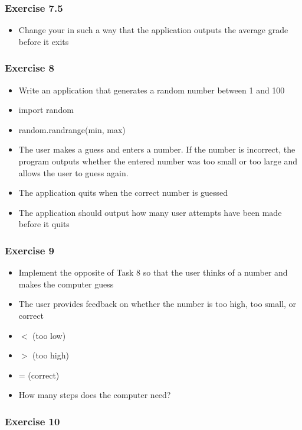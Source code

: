 \documentclass[10pt, a4paper]{beamer} %
\begin{document}
{\begin{frame}\frametitle{Exercise 7.5}

	\begin{itemize}
		\item Change your in such a way that the application outputs the average grade before it exits
	\end{itemize}


\end{frame}

\begin{frame}[c, fragile]\frametitle{Exercise 8}

	\begin{itemize}
		\item  Write an application that generates a random number between 1
		      and 100
		\item  import random
		\item  random.randrange(min, max)
		\item  The user makes a guess and enters a number. If the number is incorrect, the program outputs whether the entered number was too small or too large and allows the user to guess again.
		\item  The application quits when the correct number is guessed
		\item  The application should output how many user attempts have been
		      made before it quits
	\end{itemize}

\end{frame}

\begin{frame}[c, fragile]\frametitle{Exercise 9}

	\begin{itemize}
		\item Implement the opposite of Task 8 so that the user thinks of a number and makes the computer guess
		\item The user provides feedback on whether the number is too high, too small, or correct
		\item $<$ (too low)
		\item $>$ (too high)
		\item = (correct)
		\item How many steps does the computer need?
	\end{itemize}
\end{frame}


\begin{frame}\frametitle{Exercise 10}


\end{frame}}
\end{document}
